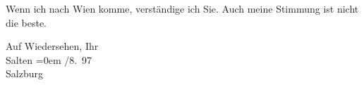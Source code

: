 \pstart
           Wenn ich nach Wien komme, verständige ich Sie.
               Auch meine Stimmung ist nicht die beste.\pend
           
\pstart
           Auf Wiedersehen, Ihr {\\[\baselineskip]}\spacefill\mbox{Salten}\pend
           \leftskip=0em{}
/8. 97{\\}Salzburg\pend
           \endnumbering{}  \newcommand{\dateiname}{L03273}\newcommand{\titel}{Felix Salten an Arthur Schnitzler, 31. 8. 1897}\newcommand{\editorInnen}{Martin Anton Müller und Laura Untner}
